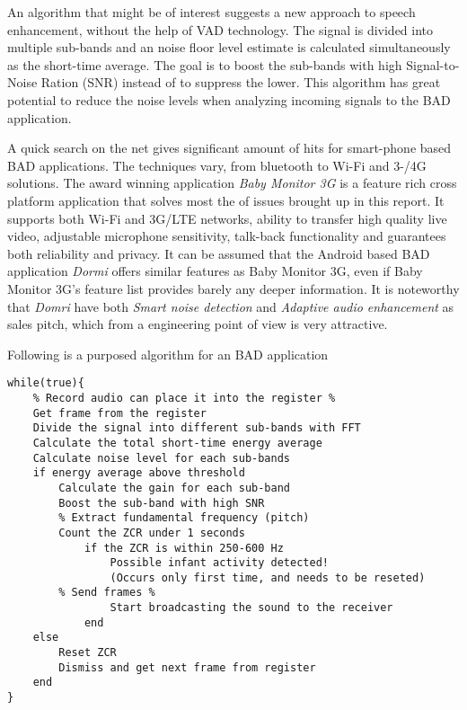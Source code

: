 An algorithm that might be of interest \cite{blekinge} suggests a new approach to speech enhancement, 
without the help of VAD technology. The signal is divided into multiple sub-bands and an noise floor 
level estimate is calculated simultaneously as the short-time average. The goal is to boost the 
sub-bands with high Signal-to-Noise Ration (SNR) instead of to suppress the lower. This algorithm 
has great potential to reduce the noise levels when analyzing incoming signals to the BAD application. 

A quick search on the net gives significant amount of hits for smart-phone based BAD applications. The techniques 
vary, from bluetooth to Wi-Fi and 3-/4G solutions. The award winning application \emph{Baby Monitor 3G} 
\cite{bm3G} is a feature rich cross platform application that solves most the of issues brought up in this report. It supports 
both Wi-Fi and 3G/LTE networks, ability to transfer high quality live video, adjustable microphone sensitivity, 
talk-back functionality and guarantees both reliability and privacy. It can be assumed that the Android based BAD 
application \emph{Dormi} \cite{sleekbit} offers similar features as Baby Monitor 3G, even if Baby Monitor 3G's feature list 
provides barely any deeper information. It is noteworthy that \emph{Domri} have both \emph{Smart noise detection} 
and \emph{Adaptive audio enhancement} as sales pitch, which from a engineering point of view is very attractive. 

Following is a purposed algorithm for an BAD application
\newpage
\begin{verbatim}
while(true){
    % Record audio can place it into the register %
    Get frame from the register 
    Divide the signal into different sub-bands with FFT
    Calculate the total short-time energy average  
    Calculate noise level for each sub-bands
    if energy average above threshold
        Calculate the gain for each sub-band
        Boost the sub-band with high SNR
        % Extract fundamental frequency (pitch)
        Count the ZCR under 1 seconds
            if the ZCR is within 250-600 Hz 
                Possible infant activity detected!
                (Occurs only first time, and needs to be reseted)
		% Send frames %
                Start broadcasting the sound to the receiver    
            end
    else
        Reset ZCR
        Dismiss and get next frame from register
    end
}
\end{verbatim}
